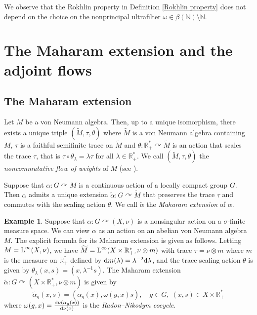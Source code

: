 \documentclass[a4paper,11pt]{amsart}
\numberwithin{equation}{section}
\theoremstyle{definition}
\newtheorem{example}[theorem]{Example}
\newcommand{\R}{\mathbb{R}}
\newcommand{\N}{\mathbb{N}}
\newcommand{\rd}{\text{\rm d}}
\newcommand{\rL}{\mathord{\text{\rm L}}}
\begin{document}
We observe that the Rokhlin property in Definition \ref{Rokhlin property} does not depend on the choice on the nonprincipal ultrafilter $\omega \in \beta(\N) \setminus \N$.




\section{The Maharam extension and the adjoint flows}



\subsection{The Maharam extension}
Let $M$ be a von Neumann algebra. Then, up to a unique isomorphism, there exists a unique triple $(\widetilde{M},\tau,\theta)$ where $\widetilde{M}$ is a von Neumann algebra containing $M$, $\tau$ is a faithful semifinite trace on $\widetilde{M}$ and $\theta : \R^*_+ \curvearrowright \widetilde{M}$ is an action that scales the trace $\tau$, that is $\tau \circ \theta_\lambda =\lambda \tau$ for all $\lambda \in \R^*_+$. We call $(\widetilde{M},\tau,\theta)$ the \emph{noncommutative flow of weights} of $M$ (see \cite[Chapter ${\rm XII}$]{Ta03}). 

Suppose that $\alpha : G \curvearrowright M$ is a continuous action of a locally compact group $G$. Then $\alpha$ admits a unique extension $\tilde{\alpha} : G \curvearrowright \widetilde{M}$ that preserves the trace $\tau$ and commutes with the scaling action $\theta$. We call $\tilde{\alpha}$ the \emph{Maharam extension} of $\alpha$.

\begin{example}
    Suppose that $\alpha : G \curvearrowright (X,\nu)$ is a nonsingular action on a $\sigma$-finite measure space. We can view $\alpha$ as an action on an abelian von Neumann algebra $M$. The explicit formula for its Maharam extension is given as follows. Letting $M=\rL^\infty(X,\nu)$, we have $\widetilde{M}=\rL^\infty(X \times \R^*_+,\nu \otimes m)$ with trace $\tau=\nu \otimes m$ where $m$ is the measure on $\R^*_+$ defined by $\rd m(\lambda) = \lambda^{- 2}\rd \lambda$, and the trace scaling action $\theta$ is given by $\theta_\lambda(x,s)=(x,\lambda^{-1}s)$. The Maharam extension $\widetilde{\alpha} : G \curvearrowright (X \times \R^*_+, \nu \otimes m)$ is given by
    $$ \widetilde{\alpha}_g(x,s)=(\alpha_g(x), \omega(g,x) s), \quad g \in G, \; (x,s) \in X \times \R^*_+$$
    where $\omega(g,x)=\frac{\rd \nu (\alpha_g(x))}{\rd \nu(x)}$ is the \emph{Radon--Nikodym cocycle}. 
\end{example}
\end{document}
